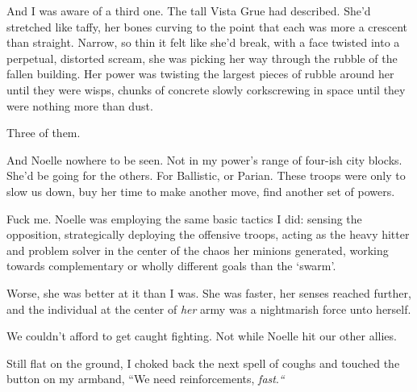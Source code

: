 And I was aware of a third one.  The tall Vista Grue had described.  She'd stretched like taffy, her bones curving to the point that each was more a crescent than straight.  Narrow, so thin it felt like she'd break, with a face twisted into a perpetual, distorted scream, she was picking her way through the rubble of the fallen building.  Her power was twisting the largest pieces of rubble around her until they were wisps, chunks of concrete slowly corkscrewing in space until they were nothing more than dust.



Three of them.



And Noelle nowhere to be seen.  Not in my power's range of four-ish city blocks.  She'd be going for the others.  For Ballistic, or Parian.  These troops were only to slow us down, buy her time to make another move, find another set of powers.



Fuck me.  Noelle was employing the same basic tactics I did: sensing the opposition, strategically deploying the offensive troops, acting as the heavy hitter and problem solver in the center of the chaos her minions generated, working towards complementary or wholly different goals than the `swarm'.



Worse, she was better at it than I was.  She was faster, her senses reached further, and the individual at the center of \emph{her} army was a nightmarish force unto herself.



We couldn't afford to get caught fighting.  Not while Noelle hit our other allies.



Still flat on the ground, I choked back the next spell of coughs and touched the button on my armband, ``We need reinforcements, \emph{fast}.\emph{``}





